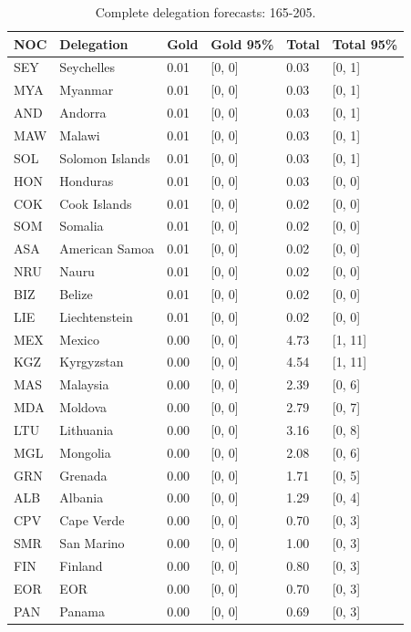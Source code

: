 \documentclass[11pt,a4paper]{article}
\begin{document}
{\small\begin{longtable}{@{}L{1.098cm} L{4.464cm} R{1.463cm} R{2.195cm} R{1.610cm} R{2.342cm}@{}}
\caption{Complete delegation forecasts: 165-205.}\label{tab:12}\\
\toprule
NOC & Delegation & Gold & Gold 95\% & Total & Total 95\%\\
\midrule
\endhead
SEY & Seychelles & 0.01 & [0, 0] & 0.03 & [0, 1]\\
MYA & Myanmar & 0.01 & [0, 0] & 0.03 & [0, 1]\\
AND & Andorra & 0.01 & [0, 0] & 0.03 & [0, 1]\\
MAW & Malawi & 0.01 & [0, 0] & 0.03 & [0, 1]\\
SOL & Solomon Islands & 0.01 & [0, 0] & 0.03 & [0, 1]\\
HON & Honduras & 0.01 & [0, 0] & 0.03 & [0, 0]\\
COK & Cook Islands & 0.01 & [0, 0] & 0.02 & [0, 0]\\
SOM & Somalia & 0.01 & [0, 0] & 0.02 & [0, 0]\\
ASA & American Samoa & 0.01 & [0, 0] & 0.02 & [0, 0]\\
NRU & Nauru & 0.01 & [0, 0] & 0.02 & [0, 0]\\
BIZ & Belize & 0.01 & [0, 0] & 0.02 & [0, 0]\\
LIE & Liechtenstein & 0.01 & [0, 0] & 0.02 & [0, 0]\\
MEX & Mexico & 0.00 & [0, 0] & 4.73 & [1, 11]\\
KGZ & Kyrgyzstan & 0.00 & [0, 0] & 4.54 & [1, 11]\\
MAS & Malaysia & 0.00 & [0, 0] & 2.39 & [0, 6]\\
MDA & Moldova & 0.00 & [0, 0] & 2.79 & [0, 7]\\
LTU & Lithuania & 0.00 & [0, 0] & 3.16 & [0, 8]\\
MGL & Mongolia & 0.00 & [0, 0] & 2.08 & [0, 6]\\
GRN & Grenada & 0.00 & [0, 0] & 1.71 & [0, 5]\\
ALB & Albania & 0.00 & [0, 0] & 1.29 & [0, 4]\\
CPV & Cape Verde & 0.00 & [0, 0] & 0.70 & [0, 3]\\
SMR & San Marino & 0.00 & [0, 0] & 1.00 & [0, 3]\\
FIN & Finland & 0.00 & [0, 0] & 0.80 & [0, 3]\\
EOR & EOR & 0.00 & [0, 0] & 0.70 & [0, 3]\\
PAN & Panama & 0.00 & [0, 0] & 0.69 & [0, 3]\\

\end{longtable}}
\end{document}
